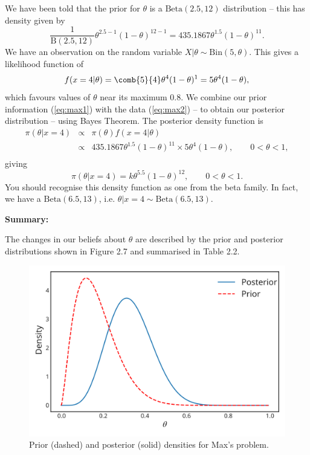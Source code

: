 {{    We have been told that the prior for $\theta$ is a $\text{Beta}(2.5,12)$ distribution -- this has density given by
    \begin{equation}
    \frac{1}{\mathrm{B}(2.5,12)}\theta^{2.5-1}(1-\theta)^{12-1} = 435.1867\theta^{1.5}(1-\theta)^{11}.
    \label{eq:max1}
    \end{equation}
    We have an observation on the random variable $X|\theta \sim \text{Bin}(5,\theta)$.  This gives a likelihood function of 
    \begin{equation}
    f(x=4|\theta)  = \comb{5}{4} \theta^{4}(1-\theta)^{1} = 5 \theta^{4}(1-\theta),
    \label{eq:max2}
    \end{equation}
    which favours values of $\theta$ near its maximum 0.8.  We combine our prior information (\ref{eq:max1}) with the data (\ref{eq:max2}) -- to obtain our posterior distribution -- using Bayes Theorem.  The posterior density function is
    \begin{eqnarray*}
    \pi(\theta|x=4) &\propto& \pi(\theta)f(x=4|\theta)\\
                    &\propto& 435.1867 \theta^{1.5}(1-\theta)^{11} \times 5 \theta^{4}(1-\theta), \qquad 0<\theta<1,  \\
    \end{eqnarray*}
    giving
    \begin{equation}
    \pi(\theta|x=4) = k \theta^{5.5}(1-\theta)^{12}, \qquad 0<\theta<1.
    \label{eq:max3} 
    \end{equation}
    You should recognise this density function as one from the beta family.  In fact, we have a $\text{Beta}(6.5, 13)$, i.e. $\theta|x=4 \sim \text{Beta}(6.5,13)$.  
    
    
}
\newpage

\textbf{Summary:}

The changes in our beliefs about $\theta$ are described by the prior and posterior distributions shown in Figure 2.7 and summarised in Table 2.2.
\begin{figure}[h!]

\includegraphics{images/priorposterior2.svg}
\caption{Prior (dashed) and posterior (solid) densities for Max's problem.}



\end{figure}}
